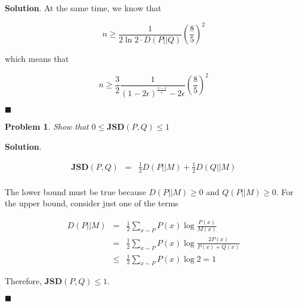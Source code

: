 \documentclass[12pt]{article}
\newtheorem{p}{Problem}[section]
\theoremstyle{definition}
\newenvironment{s}{%
        \begin{trivlist} \item \textbf{Solution}. }{%
            \hspace*{\fill} $\blacksquare$\end{trivlist}}%
\begin{document}
{\begin{s}
At the same time, we know that

\begin{equation*}
n \geq \frac{1}{2\ln 2 \cdot D(P||Q)}\left(\frac{8}{5}\right)^{2}
\end{equation*}

which means that

\begin{equation*}
n \geq \frac{3}{2}\frac{1}{(1-2\epsilon)^{\frac{1-\epsilon}{\epsilon}}-2\epsilon}\left(\frac{8}{5}\right)^{2}
\end{equation*}

\end{s}

\begin{p}
Show that $0 \leq \mathbf{JSD}(P,Q) \leq 1$
\end{p}

\begin{s}

\begin{eqnarray*}
\mathbf{JSD}(P,Q) &=& \frac{1}{2}D(P||M) + \frac{1}{2}D(Q||M)\\
\end{eqnarray*}

The lower bound must be true because $D(P||M) \geq 0$ and $Q(P||M) \geq 0$. For the upper bound, consider just one of the terms

\begin{eqnarray*}
D(P||M) &=& \frac{1}{2}\sum_{x\sim P} P(x)\log \frac{P(x)}{M(x)}\\
&=&  \frac{1}{2}\sum_{x\sim P} P(x)\log \frac{2P(x)}{P(x)+Q(x)}\\
&\leq &  \frac{1}{2}\sum_{x\sim P} P(x)\log 2 = 1
\end{eqnarray*}

Therefore, $\mathbf{JSD}(P,Q) \leq 1$.

\end{s}
\end{document}
